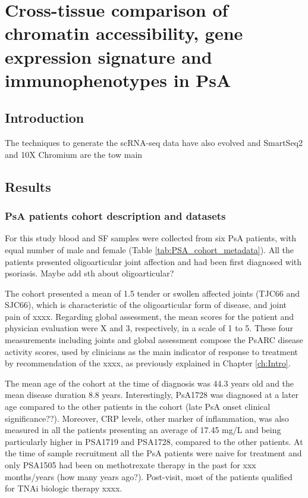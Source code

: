 \chapter{Cross-tissue comparison of chromatin accessibility, gene expression signature and immunophenotypes in PsA}
\label{ch:Results3}


\section{Introduction}
%
The techniques to generate the scRNA-seq data have also evolved and SmartSeq2 and 10X Chromium are the tow main 
\section{Results}
%

\subsection{PsA patients cohort description and datasets}
For this study blood and SF samples were collected from six PsA patients, with equal number of male and female (Table \ref{tab:PSA_cohort_metadata}). All the patients presented oligoarticular joint affection and had been first diagnosed with psoriasis. Maybe add sth about oligoarticular?

The cohort presented a mean of 1.5 tender or swollen affected joints (TJC66 and SJC66), which is characteristic of the oligoarticular form of disease, and joint pain of xxxx. Regarding global assessment, the mean scores for the patient and physician evaluation were X and 3, respectively, in a scale of 1 to 5. These four measurements including joints and global assessment compose the PsARC disease activity scores, used by clinicians as the main indicator of response to treatment by recommendation of the xxxx, as previously explained in Chapter \ref{ch:Intro}. 

The mean age of the cohort at the time of diagnosis was 44.3 years old and the mean disease duration 8.8 years. Interestingly, PsA1728 was diagnosed at a later age compared to the other patients in the cohort (late PsA onset clinical significance??). Moreover, CRP levels, other marker of inflammation, was also measured in all the patients presenting an average of 17.45 mg/L and being particularly higher in PSA1719 and PSA1728, compared to the other patients. At the time of sample recruitment all the PsA patients were naive for treatment and only PSA1505 had been on methotrexate therapy in the past for xxx months/years (how many years ago?). Post-visit, most of the patients qualified for TNAi biologic therapy xxxx.


